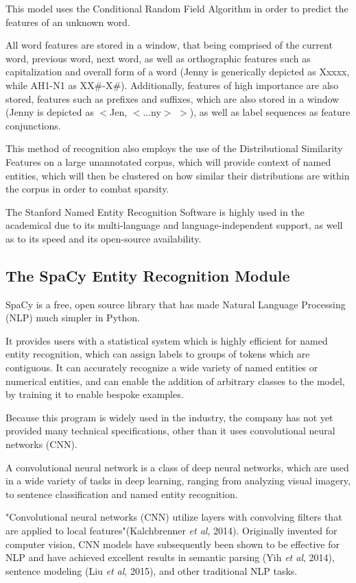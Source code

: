 \documentclass[12pt,a4paper]{article}
\begin{document}
\qquad \quad This model uses the Conditional Random Field Algorithm in order to predict the features of an unknown word. 

\qquad All word features are stored in a window, that being comprised of the current word, previous word, next word, as well as orthographic features such as capitalization and overall form of a word (Jenny is generically depicted as Xxxxx, while AH1-N1 as XX$\#$-X$\#$). Additionally, features of high importance are also stored, features such as prefixes and suffixes, which are also stored in a window (Jenny is depicted as $<$Jen, $<$...ny$>$ $>$), as well as label sequences as feature conjunctions.

\qquad This method of recognition also employs the use of the Distributional Similarity Features on a large unannotated corpus, which will provide context of named entities, which will then be clustered on how similar their distributions are within the corpus in order to combat sparsity.

\qquad The Stanford Named Entity Recognition Software is highly used in the academical due to its multi-language and language-independent support, as well as to its speed and its open-source availability.
\subsection{The SpaCy Entity Recognition Module}
\qquad \quad SpaCy is a free, open source library that has made Natural Language Processing (NLP) much simpler in Python.

\qquad It provides users with a statistical system which is highly efficient for named entity recognition, which can assign labels to groups of tokens which are contiguous. It can accurately recognize a wide variety of named entities or numerical entities, and can enable the addition of arbitrary classes to the model, by training it to enable bespoke examples. 

\qquad Because this program is widely used in the industry, the company has not yet provided many technical specifications, other than it uses convolutional neural networks (CNN).

\qquad A convolutional neural network is a class of deep neural networks, which are used in a wide variety of tasks in deep learning, ranging from analyzing visual imagery, to sentence classification and named entity recognition. 

\qquad "Convolutional neural networks (CNN) utilize layers with convolving filters that are applied to local features"(Kalchbrenner \textit{et al}, 2014). Originally invented for computer vision, CNN models have subsequently been shown to be effective for NLP and have achieved excellent results in semantic parsing (Yih \textit{et al}, 2014), sentence modeling (Liu \textit{et al}, 2015), and other traditional NLP tasks. 
\end{document}
